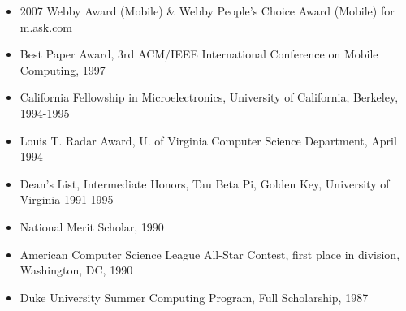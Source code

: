 \begin{itemize}
\item 2007 Webby Award (Mobile) \& Webby People’s Choice Award (Mobile) for m.ask.com \\[-18pt]
\item  Best Paper Award, 3rd ACM/IEEE International Conference on Mobile Computing, 1997 \\[-18pt]
\item  California Fellowship in Microelectronics,
        University of California, Berkeley, 1994-1995 \\[-18pt]
\item  Louis T. Radar Award, U. of Virginia Computer Science Department, April 1994 \\[-18pt]
\item  Dean's List, Intermediate Honors, Tau Beta Pi, Golden Key, University of Virginia 1991-1995 \\[-18pt]
\item  National Merit Scholar, 1990 \\[-18pt]
\item  American Computer Science League All-Star Contest, 
       first place in division, Washington, DC, 1990 \\[-18pt]
\item    Duke University Summer Computing Program, Full Scholarship, 1987 \\
\end{itemize}


